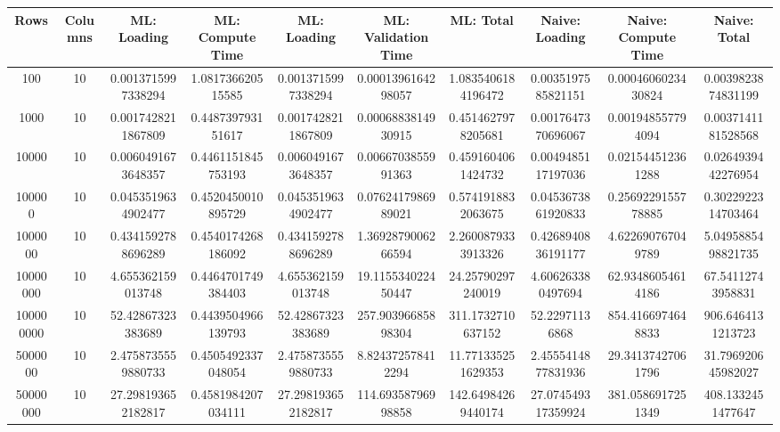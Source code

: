 \begin{table}[htb]
    \centering
    \begin{tabular}{@{}cccccccccc@{}}
        \toprule
        Rows & Columns & ML: Loading & ML: Compute Time & ML: Loading & ML: Validation Time & ML: Total & Naive: Loading & Naive: Compute Time & Naive: Total \\
        \midrule
        100 & 10 & 0.0013715997338294 & 1.081736620515585 & 0.0013715997338294 & 0.0001396164298057 & 1.0835406184196472 & 0.0035197585821151 & 0.0004606023430824 & 0.0039823874831199 \\
        1000 & 10 & 0.0017428211867809 & 0.448739793151617 & 0.0017428211867809 & 0.0006883814930915 & 0.4514627978205681 & 0.0017647370696067 & 0.001948557794094 & 0.0037141181528568 \\
        10000 & 10 & 0.0060491673648357 & 0.4461151845753193 & 0.0060491673648357 & 0.0066703855991363 & 0.4591604061424732 & 0.0049485117197036 & 0.021544512361288 & 0.0264939442276954 \\
        100000 & 10 & 0.0453519634902477 & 0.4520450010895729 & 0.0453519634902477 & 0.0762417986989021 & 0.5741918832063675 & 0.0453673861920833 & 0.2569229155778885 & 0.3022922314703464 \\
        1000000 & 10 & 0.4341592788696289 & 0.4540174268186092 & 0.4341592788696289 & 1.3692879006266594 & 2.2600879333913326 & 0.4268940836191177 & 4.622690767049789 & 5.0495885498821735 \\
        10000000 & 10 & 4.655362159013748 & 0.4464701749384403 & 4.655362159013748 & 19.115534022450447 & 24.25790297240019 & 4.606263380497694 & 62.93486054614186 & 67.54112743958831 \\
        100000000 & 10 & 52.42867323383689 & 0.4439504966139793 & 52.42867323383689 & 257.90396685898304 & 311.1732710637152 & 52.22971136868 & 854.4166974648833 & 906.6464131213723 \\
        5000000 & 10 & 2.4758735559880733 & 0.4505492337048054 & 2.4758735559880733 & 8.824372578412294 & 11.771335251629353 & 2.4555414877831936 & 29.34137427061796 & 31.796920645982027 \\
        50000000 & 10 & 27.298193652182817 & 0.4581984207034111 & 27.298193652182817 & 114.69358796998858 & 142.64984269440174 & 27.074549317359924 & 381.0586917251349 & 408.1332451477647 \\
        \bottomrule
    \end{tabular}
\end{table}
